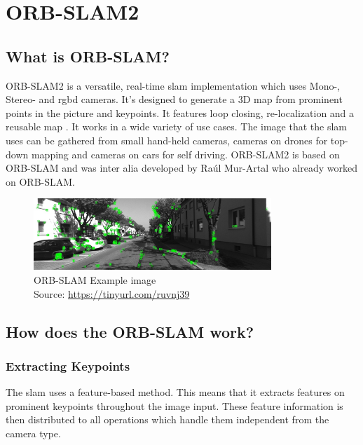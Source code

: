 
\chapter{ORB-SLAM2\authorA}\label{ref:orbslam}

\section{What is ORB-SLAM?}
ORB-SLAM2 is a versatile, real-time \gls{slam} implementation which uses Mono-, Stereo- and \gls{rgbd} cameras. It's designed to generate a 3D map from prominent points in the picture and keypoints. It features loop closing, re-localization and a reusable map \cite{orbslam2}. It works in a wide variety of use cases. The image that the \gls{slam} uses can be gathered from small hand-held cameras, cameras on drones for top-down mapping and cameras on cars for self driving.
ORB-SLAM2 is based on ORB-SLAM and was inter alia developed by Raúl Mur-Artal who already worked on ORB-SLAM.\newline

\begin{figure}[h]
	\centering
	\includegraphics[width=0.8\textwidth]{./media/images/orb-slam-kitti-dataset.png}
  	\caption{ORB-SLAM Example image
  	\\Source: \url{https://tinyurl.com/ruvnj39}}
  	\label{orbslamkittidataset}
\end{figure}

\section{How does the ORB-SLAM work?}

\subsection{Extracting Keypoints}
The \gls{slam} uses a feature-based method. This means that it extracts features on prominent keypoints throughout the image input. These feature information is then distributed to all operations which handle them independent from the camera type. \cite{orbslam2} \newline\newline


